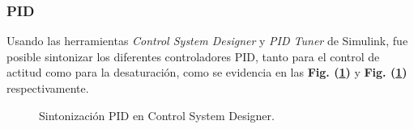 \subsubsection{PID}
\hfill \break
Usando las herramientas \textit{Control System Designer} y \textit{PID Tuner} de Simulink, fue posible sintonizar los diferentes controladores PID, tanto para el control de actitud como para la desaturación, como se evidencia en las \textbf{Fig. (\ref{fig:PID_Tuning})} y \textbf{Fig. (\ref{fig:PID_Tuning})} respectivamente. 

\begin{figure}[h]
	\centering
	
	\caption{Sintonización PID en Control System Designer.}
	\label{fig:PID_Tuning}
\end{figure}


